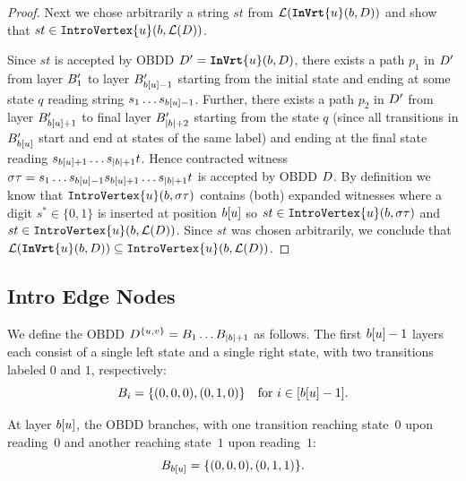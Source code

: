 \begin{proof}
Next we chose arbitrarily a string $st$ from $\mathcal{L}(\texttt{\textbf{InVrt}}\{u\}(b,D))$ and show that $st \in \texttt{IntroVertex}\{u\}(b,\mathcal{L}(D))$.

Since $st$ is accepted by OBDD $D' = \texttt{\textbf{InVrt}}\{u\}(b,D)$, there exists a path $p_1$ in $D'$ from layer $B'_1$ to layer $B'_{b[u]-1}$ starting from the initial state and ending at some state $q$ reading string $s_1\dots s_{b[u]-1}$. Further, there exists a path $p_2$ in $D'$ from layer $B'_{b[u]+1}$ to final layer $B'_{|b| + 2}$ starting from the state $q$ (since all transitions in $B'_{b[u]}$ start and end at states of the same label) and ending at the final state reading $s_{b[u] + 1} \dots s_{|b|+1}t$.
Hence contracted witness $\sigma\tau= s_1 \dots s_{b[u] - 1}s_{b[u] + 1} \dots s_{|b|+1}t$ is accepted by OBDD $D$. By definition we know that $\texttt{IntroVertex}\{u\}(b, \sigma\tau)$ contains (both) expanded witnesses where a digit $s^* \in \{0,1\}$ is inserted at position $b[u]$ so $st \in \texttt{IntroVertex}\{u\}(b, \sigma\tau)$ and $st \in \texttt{IntroVertex}\{u\}(b,\mathcal{L}(D))$. Since $st$ was chosen arbitrarily, we conclude that $\mathcal{L}(\texttt{\textbf{InVrt}}\{u\}(b,D)) \subseteq \texttt{IntroVertex}\{u\}(b,\mathcal{L}(D))$.
 

\end{proof}

\subsection{Intro Edge Nodes}

We define the OBDD $D^{\{u,v\}}
= B_1 \dots B_{|b|+1}$ as follows.
The first $b[u]-1$ layers each consist of a single left state and a
single right state, with two transitions labeled $0$ and $1$, respectively:
\[
B_i = \{(0,0,0),(0,1,0)\}
\quad\text{for } i \in [b[u]-1].
\]

At layer $b[u]$, the OBDD branches, with one transition reaching
state~$0$ upon reading~$0$ and another reaching state~$1$ upon reading~$1$:
\[
B_{b[u]} = \{(0,0,0),(0,1,1)\}.
\]

